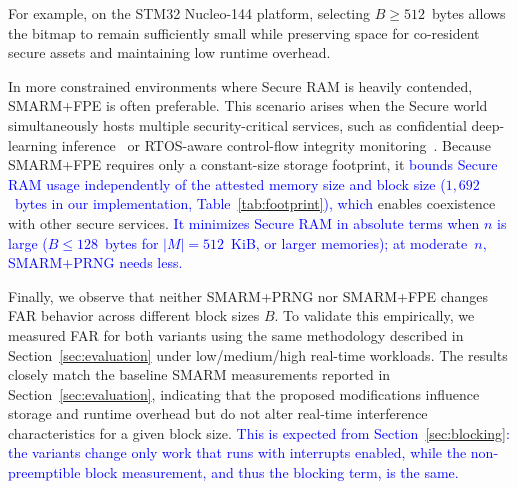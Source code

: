 \documentclass[journal]{IEEEtran}
\newcommand\ben[1]{\textcolor{blue}{#1}}
\newcommand{\rtsmarmone}{SMARM+PRNG\xspace}
\newcommand{\rtsmarmtwo}{SMARM+FPE\xspace}
\begin{document}
For example, on the STM32 Nucleo-144 platform, selecting $B \geq 512$~bytes allows the bitmap to remain sufficiently small while preserving space for co-resident secure assets and maintaining low runtime overhead.

In more constrained environments where Secure RAM is heavily contended, \rtsmarmtwo is often preferable.
This scenario arises when the Secure world simultaneously hosts multiple security-critical services, such as confidential deep-learning inference~\cite{tslices} or RTOS-aware control-flow integrity monitoring~\cite{tzmcfi}.
Because \rtsmarmtwo requires only a constant-size storage footprint, it \ben{bounds Secure RAM usage independently of the attested memory size and block size ($1{,}692$~bytes in our implementation, Table~\ref{tab:footprint}), which} enables coexistence with other secure services.
\ben{It minimizes Secure RAM in absolute terms when $n$ is large ($B \le 128$~bytes for $|M| = 512$~KiB, or larger memories); at moderate~$n$, \rtsmarmone needs less.}


Finally, we observe that neither \rtsmarmone nor \rtsmarmtwo changes FAR behavior across different block sizes $B$.
To validate this empirically, we measured FAR for both variants using the same methodology described in Section~\ref{sec:evaluation} under low/medium/high real-time workloads.
The results closely match the baseline SMARM measurements reported in Section~\ref{sec:evaluation}, indicating that the proposed modifications influence storage and runtime overhead but do not alter real-time interference characteristics for a given block size.
\ben{This is expected from Section~\ref{sec:blocking}: the variants change only work that runs with interrupts enabled, while the non-preemptible block measurement, and thus the blocking term, is the same.}
\end{document}
